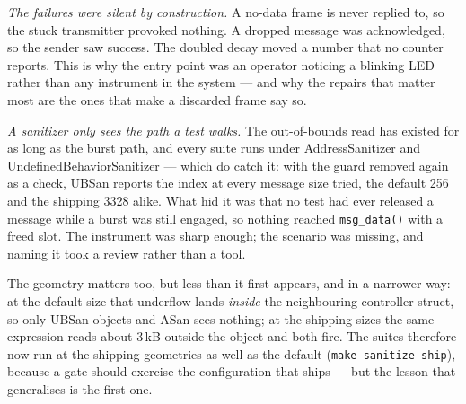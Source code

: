 \emph{The failures were silent by construction.}  A no-data frame is
never replied to, so the stuck transmitter provoked nothing.  A dropped
message was acknowledged, so the sender saw success.  The doubled decay
moved a number that no counter reports.  This is why the entry point was
an operator noticing a blinking LED rather than any instrument in the
system --- and why the repairs that matter most are the ones that make a
discarded frame say so.

\emph{A sanitizer only sees the path a test walks.}  The
out-of-bounds read has existed for as long as the burst path, and every
suite runs under AddressSanitizer and UndefinedBehaviorSanitizer ---
which do catch it: with the guard removed again as a check, UBSan
reports the index at every message size tried, the default 256 and the
shipping 3328 alike.  What hid it was that no test had ever released a
message while a burst was still engaged, so nothing reached
\texttt{msg\_data()} with a freed slot.  The instrument was sharp
enough; the scenario was missing, and naming it took a review rather
than a tool.

The geometry matters too, but less than it first appears, and in a
narrower way: at the default size that underflow lands \emph{inside} the
neighbouring controller struct, so only UBSan objects and ASan sees
nothing; at the shipping sizes the same expression reads about 3\,kB
outside the object and both fire.  The suites therefore now run at the
shipping geometries as well as the default (\texttt{make
sanitize-ship}), because a gate should exercise the configuration that
ships --- but the lesson that generalises is the first one.
